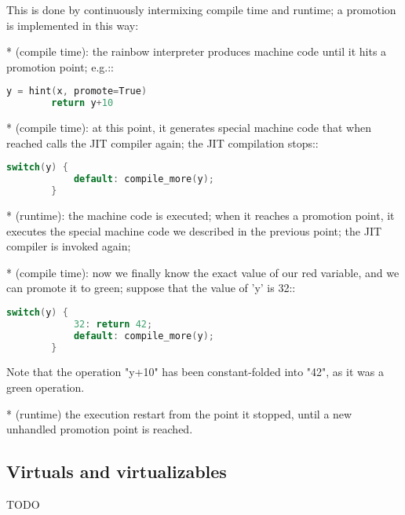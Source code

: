 This is done by continuously intermixing compile time and runtime; a promotion
is implemented in this way:

  * (compile time): the rainbow interpreter produces machine code until it
    hits a promotion point; e.g.::

    \begin{lstlisting}[language=C]
        y = hint(x, promote=True)
        return y+10
    \end{lstlisting}

  * (compile time): at this point, it generates special machine code that when
    reached calls the JIT compiler again; the JIT compilation stops::

    \begin{lstlisting}[language=C]
        switch(y) {
            default: compile_more(y);
        }
    \end{lstlisting}

  * (runtime): the machine code is executed; when it reaches a promotion
    point, it executes the special machine code we described in the previous
    point; the JIT compiler is invoked again;

  * (compile time): now we finally know the exact value of our red variable,
    and we can promote it to green; suppose that the value of 'y' is 32::

    \begin{lstlisting}[language=C]
        switch(y) {
            32: return 42;
            default: compile_more(y);
        }
    \end{lstlisting}

    Note that the operation "y+10" has been constant-folded into "42", as it
    was a green operation.

  * (runtime) the execution restart from the point it stopped, until a new
    unhandled promotion point is reached.

\subsection{Virtuals and virtualizables}

TODO
